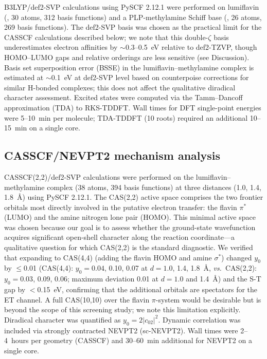 \documentclass[twoside,twocolumn,9pt]{article}
\begin{document}
B3LYP/def2-SVP calculations using PySCF 2.12.1\cite{Sun2020} were performed on lumiflavin (, 30 atoms, 312 basis functions) and a PLP-methylamine Schiff base (, 26 atoms, 269 basis functions). The def2-SVP basis was chosen as the practical limit for the CASSCF calculations described below; we note that this double-$\zeta$ basis underestimates electron affinities by $\sim$0.3--0.5~eV relative to def2-TZVP, though HOMO--LUMO gaps and relative orderings are less sensitive (see Discussion). Basis set superposition error (BSSE) in the lumiflavin--methylamine complex is estimated at $\sim$0.1~eV at def2-SVP level based on counterpoise corrections for similar H-bonded complexes; this does not affect the qualitative diradical character assessment. Excited states were computed via the Tamm--Dancoff approximation (TDA) to RKS-TDDFT. Wall times for DFT single-point energies were 5--10~min per molecule; TDA-TDDFT (10 roots) required an additional 10--15~min on a single core.

\subsection{CASSCF/NEVPT2 mechanism analysis}

CASSCF(2,2)/def2-SVP calculations were performed on the lumiflavin--methylamine complex (38 atoms, 394 basis functions) at three  distances (1.0, 1.4, 1.8~\AA) using PySCF 2.12.1.\cite{Sun2020} The CAS(2,2) active space comprises the two frontier orbitals most directly involved in the putative electron transfer: the flavin $\pi^*$ (LUMO) and the amine nitrogen lone pair (HOMO). This minimal active space was chosen because our goal is to assess whether the ground-state wavefunction acquires significant open-shell character along the reaction coordinate---a qualitative question for which CAS(2,2) is the standard diagnostic.\cite{Nakano2017} We verified that expanding to CAS(4,4) (adding the flavin HOMO and amine $\sigma^*$) changed $y_0$ by $\leq$0.01 (CAS(4,4): $y_0 = 0.04$, 0.10, 0.07 at $d = 1.0$, 1.4, 1.8~\AA, \textit{vs.}\ CAS(2,2): $y_0 = 0.03$, 0.09, 0.06; maximum deviation 0.01 at $d = 1.0$ and 1.4~\AA) and the S-T gap by $<$0.15~eV, confirming that the additional orbitals are spectators for the ET channel. A full CAS(10,10) over the flavin $\pi$-system would be desirable but is beyond the scope of this screening study; we note this limitation explicitly. Diradical character was quantified as $y_0 = 2|c_{02}|^2$.\cite{Nakano2017} Dynamic correlation was included via strongly contracted NEVPT2 (sc-NEVPT2).\cite{Angeli2001} Wall times were 2--4~hours per geometry (CASSCF) and 30--60~min additional for NEVPT2 on a single core.
\end{document}

